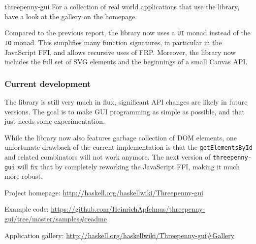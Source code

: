 \begin{hcarentry}[updated]{threepenny-gui}
For a collection of real world applications that use the library, have a look at the gallery on the homepage.

Compared to the previous report, the library now uses a \verb`UI` monad instead of the \verb`IO` monad. This simplifies many function signatures, in particular in the JavaScript FFI, and allows recursive uses of FRP. Moreover, the library now includes the full set of SVG elements and the beginnings of a small Canvas API.

\subsubsection*{Current development}

The library is still very much in flux, significant API changes are likely in future versions. The goal is to make GUI programming as simple as possible, and that just needs some experimentation.

While the library now also features garbage collection of DOM elements, one unfortunate drawback of the current implementation is that the  \verb`getElementsById` and related combinators will not work anymore. The next version of \verb`threepenny-gui` will fix that by completely reworking the JavaScript FFI, making it much more robust.

\FurtherReading
\begin{compactitem}
\item Project homepage: \url{http://haskell.org/haskellwiki/Threepenny-gui}
\item Example code: \url{https://github.com/HeinrichApfelmus/threepenny-gui/tree/master/samples#readme}
\item Application gallery: \url{http://haskell.org/haskellwiki/Threepenny-gui#Gallery}
\end{compactitem}
\end{hcarentry}
